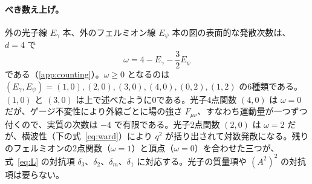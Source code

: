\documentclass[a4paper,10pt]{ltjsarticle}
\begin{document}
\paragraph{べき数え上げ。}外の光子線 $E_\gamma$ 本、外のフェルミオン線 $E_\psi$ 本の図の表面的な発散次数は、$d=4$ で
\begin{equation}
\omega=4-E_\gamma-\frac32E_\psi
\label{eq:omega}
\end{equation}
である（\ref{app:counting}）。$\omega\ge0$ となるのは $(E_\gamma,E_\psi)=(1,0),(2,0),(3,0),(4,0),(0,2),(1,2)$ の6種類である。$(1,0)$ と $(3,0)$ は上で述べたように0である。光子4点関数 $(4,0)$ は $\omega=0$ だが、ゲージ不変性により外線ごとに場の強さ $F_{\mu\nu}$、すなわち運動量が一つずつ付くので、実質の次数は $-4$ で有限である。光子2点関数 $(2,0)$ は $\omega=2$ だが、横波性（下の式~\eqref{eq:ward}）により $q^2$ が括り出されて対数発散になる。残りのフェルミオンの2点関数（$\omega=1$）と頂点（$\omega=0$）を合わせた三つが、式~\eqref{eq:L} の対抗項 $\delta_3$、$\delta_2$、$\delta_m$、$\delta_1$ に対応する。光子の質量項や $(A^2)^2$ の対抗項は要らない。
\end{document}
